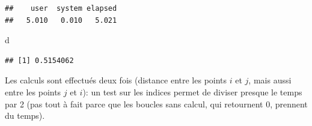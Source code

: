 \documentclass[
  12pt,
  french,
  a4paper,
  extrafontsizes,onecolumn,openright
  ]{memoir}
\newenvironment{Shaded}{\begin{snugshade}}{\end{snugshade}}
\newcommand{\ControlFlowTok}[1]{\textcolor[rgb]{0.13,0.29,0.53}{\textbf{#1}}}
\newcommand{\DecValTok}[1]{\textcolor[rgb]{0.00,0.00,0.81}{#1}}
\newcommand{\KeywordTok}[1]{\textcolor[rgb]{0.13,0.29,0.53}{\textbf{#1}}}
\newcommand{\NormalTok}[1]{#1}
\newcommand{\OperatorTok}[1]{\textcolor[rgb]{0.81,0.36,0.00}{\textbf{#1}}}
\newcommand{\StringTok}[1]{\textcolor[rgb]{0.31,0.60,0.02}{#1}}
\begin{document}
\begin{verbatim}
##    user  system elapsed 
##   5.010   0.010   5.021
\end{verbatim}

\begin{Shaded}
\begin{Highlighting}[]
\NormalTok{d}
\end{Highlighting}
\end{Shaded}

\begin{verbatim}
## [1] 0.5154062
\end{verbatim}

\normalsize

Les calculs sont effectués deux fois (distance entre les points \(i\) et \(j\), mais aussi entre les points \(j\) et \(i\)): un test sur les indices permet de diviser presque le temps par 2 (pas tout à fait parce que les boucles sans calcul, qui retournent \(0\), prennent du temps).

\scriptsize

\begin{Shaded}
\end{Shaded}
\end{document}
